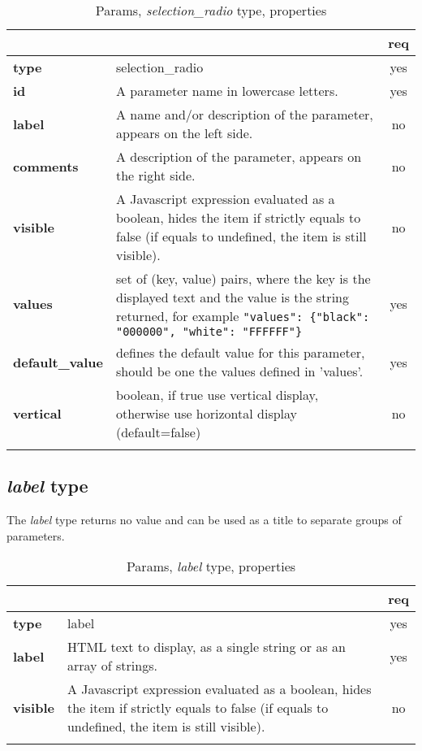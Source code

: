 \begin{longtable}{|>{\bf}L{\linewidth}|L{\linewidth}|c|}
\hline
      &  & {\bf req} 
\tabularnewline \hline \hline
 type     & selection\_radio    & yes \\ \hline
 id     & A parameter name in lowercase letters. & yes \\ \hline
 label  & A name and/or description of the parameter, appears on the left side. & no
                      \\ \hline
 comments & A description of the parameter, appears on the right side. & no
                      \\ \hline
 visible    & A Javascript expression evaluated as a boolean, hides the item if
              strictly equals to false (if equals to undefined, the item is still visible). 
            & no \\ \hline
 values   & set of (key, value) pairs, where the key is the displayed text and the 
value is the string returned, for example \texttt{"values": \{"black": "000000", "white": "FFFFFF"\}} & yes
                      \\ \hline
 default\_value & defines the default value for this parameter, should be one 
the values defined in 'values'. & yes \\ \hline
 vertical & boolean, if true use vertical display, otherwise use horizontal
            display (default=false) & no \\ \hline
\caption{Params, \emph{selection\_radio} type, properties}
\end{longtable}

\subsection{ \emph{label} type}

The \emph{label} type returns no value and can be used as a title to separate groups of parameters.

\begin{longtable}{|>{\bf}L{\linewidth}|L{\linewidth}|c|}
\hline
      &  & {\bf req} 
\tabularnewline \hline \hline
 type  & label       & yes \\ \hline
 label & HTML text to display, as a single string or as an array of strings. & yes \\ \hline
 visible    & A Javascript expression evaluated as a boolean, hides the item if
              strictly equals to false (if equals to undefined, the item is still visible).
            & no \\ \hline
                      
\caption{Params, \emph{label} type, properties}
\end{longtable}


